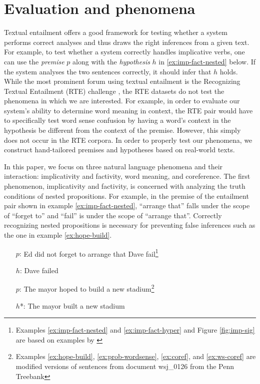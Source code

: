 \section{Evaluation and phenomena}

Textual entailment offers a good framework for testing whether a
system performs correct analyses and thus draws the right inferences
from a given text. For example, to test whether a system correctly
handles implicative verbs, one can use the \emph{premise} $p$ along with
the \emph{hypothesis} $h$ in \eqref{ex:imp-fact-nested} below. If the system
analyses the two sentences correctly, it should infer that $h$ holds.
While the most prominent forum using textual entailment is the 
Recognizing Textual Entailment (RTE) challenge \citep{dagan:rte2005},
the RTE datasets 
do not test the phenomena in which we are interested.
For example, in order to evaluate our system's ability to determine word meaning
in context, the RTE pair would have to specifically test word sense confusion by
having a word's context in the hypothesis be different from the context of the
premise.  However, this simply does not occur in the RTE corpora.  In order to
properly test our phenomena, we construct hand-tailored premises and hypotheses
based on real-world texts.


In this paper, we focus on three natural language phenomena and their
interaction: implicativity and factivity, word meaning, and coreference.
The first phenomenon, implicativity and factivity, is concerned with analyzing
the truth conditions of nested propositions.  For example, in the premise of
the entailment pair shown in example 
\eqref{ex:imp-fact-nested}, ``arrange that'' falls under the scope of 
``forget to'' and ``fail'' is under the scope of ``arrange that''.
Correctly recognizing nested propositions is necessary for preventing
false inferences such as the one
in example \eqref{ex:hope-build}.

\begin{example}\label{ex:imp-fact-nested}
\begin{itemize}
  \item[$p$:] Ed did not forget to arrange that Dave 
fail\footnote{Examples \eqref{ex:imp-fact-nested}
and \eqref{ex:imp-fact-hyper} and Figure \ref{fig:imp-sig} are based on examples by
\citet{maccartney:iwcs2009}}
  \item[$h$:] Dave failed
\end{itemize}
\end{example}

\begin{example}\label{ex:hope-build}
\begin{itemize}
  \item[$p$:] The mayor hoped to build a new stadium\footnote{Examples
\eqref{ex:hope-build}, \eqref{ex:prob-wordsense}, \eqref{ex:coref}, and
\eqref{ex:ws-coref} are modified versions of sentences from document wsj\_0126
from the Penn Treebank}
  \item[$h$*:] The mayor built a new stadium
\end{itemize}
\end{example}


